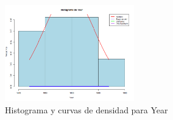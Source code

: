 \documentclass{article}
\begin{document}
\begin{itemize}
            \begin{figure}[H]
                \centering
                \includegraphics[width=0.5\textwidth]{HistogramasDensidad/histograma_Year.png}
                \caption{Histograma y curvas de densidad para Year}
                \vspace{0.5cm}
            \end{figure}


\end{itemize}
\end{document}
